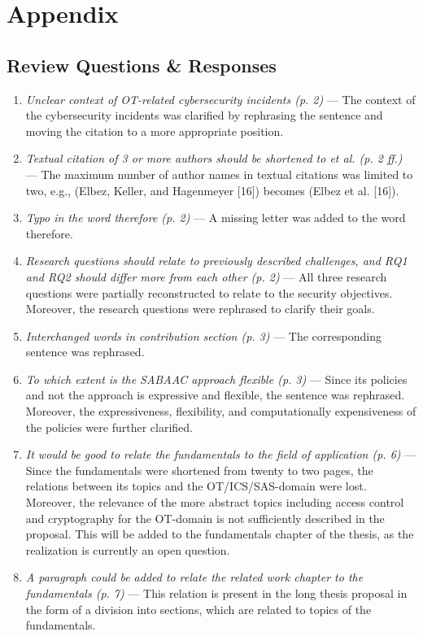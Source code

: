 \chapter{Appendix}
\label{chap:appendix}
\section{Review Questions \& Responses}
\begin{enumerate}[label=Q\arabic*.]
    \item \textit{Unclear context of OT-related cybersecurity incidents (p. 2)} --- The context of the cybersecurity incidents was clarified by rephrasing the sentence and moving the citation to a more appropriate position.
    \item \textit{Textual citation of 3 or more authors should be shortened to et al. (p. 2 ff.)} --- The maximum number of author names in textual citations was limited to two, e.g., (Elbez, Keller, and Hagenmeyer [16]) becomes (Elbez et al. [16]).
    \item \textit{Typo in the word therefore (p. 2)} --- A missing letter was added to the word therefore.
    \item \textit{Research questions should relate to previously described challenges, and RQ1 and RQ2 should differ more from each other (p. 2)} --- All three research questions were partially reconstructed to relate to the security objectives. Moreover, the research questions were rephrased to clarify their goals.
    \item \textit{Interchanged words in contribution section (p. 3)} --- The corresponding sentence was rephrased.
    \item \textit{To which extent is the SABAAC approach flexible (p. 3)} --- Since its policies and not the approach is expressive and flexible, the sentence was rephrased. Moreover, the expressiveness, flexibility, and computationally expensiveness of the policies were further clarified.
    \item \textit{It would be good to relate the fundamentals to the field of application (p. 6)} --- Since the fundamentals were shortened from twenty to two pages, the relations between its topics and the OT/ICS/SAS-domain were lost. Moreover, the relevance of the more abstract topics including access control and cryptography for the OT-domain is not sufficiently described in the proposal. This will be added to the fundamentals chapter of the thesis, as the realization is currently an open question.
    \item \textit{A paragraph could be added to relate the related work chapter to the fundamentals (p. 7)} --- This relation is present in the long thesis proposal in the form of a division into sections, which are related to topics of the fundamentals.

\end{enumerate}
